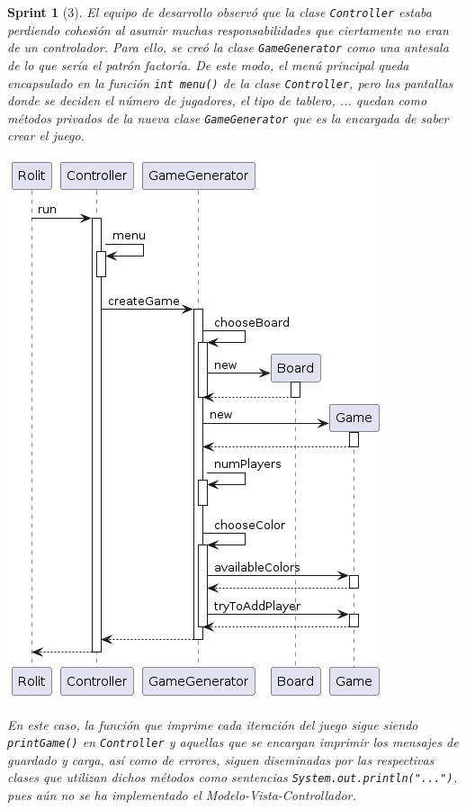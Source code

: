 \documentclass[12pt,a4paper,openright]{book}
\theoremstyle{break}
\newtheorem*{sprint}{Sprint}
\begin{document}
\begin{sprint}[3]
El equipo de desarrollo observó que la clase \texttt{Controller} estaba perdiendo cohesión al asumir muchas responsabilidades que ciertamente no eran de un controlador. Para ello, se creó la clase \texttt{GameGenerator} como una antesala de lo que sería el patrón factoría. De este modo, el menú principal queda encapsulado en la función \texttt{int menu()} de la clase \texttt{Controller}, pero las pantallas donde se deciden el número de jugadores, el tipo de tablero, ... quedan como métodos privados de la nueva clase \texttt{GameGenerator} que es la encargada de saber crear el juego.
\begin{center}
\includegraphics[scale=0.55]{MenuPpal_sprint3_seq}
\end{center}
En este caso, la función que imprime cada iteración del juego sigue siendo \texttt{printGame()} en \texttt{Controller} y aquellas que se encargan imprimir los mensajes de guardado y carga, así como de errores, siguen diseminadas por las respectivas clases que utilizan dichos métodos como sentencias \texttt{System.out.println("...")}, pues aún no se ha implementado el Modelo-Vista-Controllador.
\end{sprint}
\end{document}
